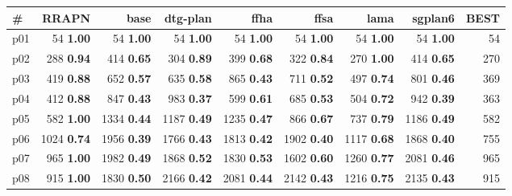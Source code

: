\begin{tabular}{|l|rrrrrrr|r|}
\hline
\textbf{\#} & \textbf{RRAPN} & \textbf{base} & \textbf{dtg-plan} & \textbf{ffha} & \textbf{ffsa} & \textbf{lama} & \textbf{sgplan6} & \textbf{BEST}\\
\hline
p01 & {\footnotesize 54} \textbf{1.00} & {\footnotesize 54} \textbf{1.00} & {\footnotesize 54} \textbf{1.00} & {\footnotesize 54} \textbf{1.00} & {\footnotesize 54} \textbf{1.00} & {\footnotesize 54} \textbf{1.00} & {\footnotesize 54} \textbf{1.00} & 54\\
p02 & {\footnotesize 288} \textbf{0.94} & {\footnotesize 414} \textbf{0.65} & {\footnotesize 304} \textbf{0.89} & {\footnotesize 399} \textbf{0.68} & {\footnotesize 322} \textbf{0.84} & {\footnotesize 270} \textbf{1.00} & {\footnotesize 414} \textbf{0.65} & 270\\
p03 & {\footnotesize 419} \textbf{0.88} & {\footnotesize 652} \textbf{0.57} & {\footnotesize 635} \textbf{0.58} & {\footnotesize 865} \textbf{0.43} & {\footnotesize 711} \textbf{0.52} & {\footnotesize 497} \textbf{0.74} & {\footnotesize 801} \textbf{0.46} & 369\\
p04 & {\footnotesize 412} \textbf{0.88} & {\footnotesize 847} \textbf{0.43} & {\footnotesize 983} \textbf{0.37} & {\footnotesize 599} \textbf{0.61} & {\footnotesize 685} \textbf{0.53} & {\footnotesize 504} \textbf{0.72} & {\footnotesize 942} \textbf{0.39} & 363\\
p05 & {\footnotesize 582} \textbf{1.00} & {\footnotesize 1334} \textbf{0.44} & {\footnotesize 1187} \textbf{0.49} & {\footnotesize 1235} \textbf{0.47} & {\footnotesize 866} \textbf{0.67} & {\footnotesize 737} \textbf{0.79} & {\footnotesize 1186} \textbf{0.49} & 582\\
p06 & {\footnotesize 1024} \textbf{0.74} & {\footnotesize 1956} \textbf{0.39} & {\footnotesize 1766} \textbf{0.43} & {\footnotesize 1813} \textbf{0.42} & {\footnotesize 1902} \textbf{0.40} & {\footnotesize 1117} \textbf{0.68} & {\footnotesize 1868} \textbf{0.40} & 755\\
p07 & {\footnotesize 965} \textbf{1.00} & {\footnotesize 1982} \textbf{0.49} & {\footnotesize 1868} \textbf{0.52} & {\footnotesize 1830} \textbf{0.53} & {\footnotesize 1602} \textbf{0.60} & {\footnotesize 1260} \textbf{0.77} & {\footnotesize 2081} \textbf{0.46} & 965\\
p08 & {\footnotesize 915} \textbf{1.00} & {\footnotesize 1830} \textbf{0.50} & {\footnotesize 2166} \textbf{0.42} & {\footnotesize 2081} \textbf{0.44} & {\footnotesize 2142} \textbf{0.43} & {\footnotesize 1216} \textbf{0.75} & {\footnotesize 2135} \textbf{0.43} & 915\\

\end{tabular}
